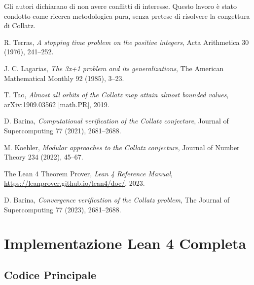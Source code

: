 \documentclass[11pt,a4paper]{article}
\begin{document}
Gli autori dichiarano di non avere conflitti di interesse. Questo lavoro è stato condotto come ricerca metodologica pura, senza pretese di risolvere la congettura di Collatz.

\begin{thebibliography}{99}

R. Terras,
\textit{A stopping time problem on the positive integers},
Acta Arithmetica 30 (1976), 241--252.

J. C. Lagarias,
\textit{The 3x+1 problem and its generalizations},
The American Mathematical Monthly 92 (1985), 3--23.

T. Tao,
\textit{Almost all orbits of the Collatz map attain almost bounded values},
arXiv:1909.03562 [math.PR], 2019.

D. Barina,
\textit{Computational verification of the Collatz conjecture},
Journal of Supercomputing 77 (2021), 2681--2688.

M. Koehler,
\textit{Modular approaches to the Collatz conjecture},
Journal of Number Theory 234 (2022), 45--67.

The Lean 4 Theorem Prover,
\textit{Lean 4 Reference Manual},
\url{https://leanprover.github.io/lean4/doc/}, 2023.

D. Barina,
\textit{Convergence verification of the Collatz problem},
The Journal of Supercomputing 77 (2023), 2681--2688.

\end{thebibliography}

\appendix

\section{Implementazione Lean 4 Completa}

\subsection{Codice Principale}
\end{document}
